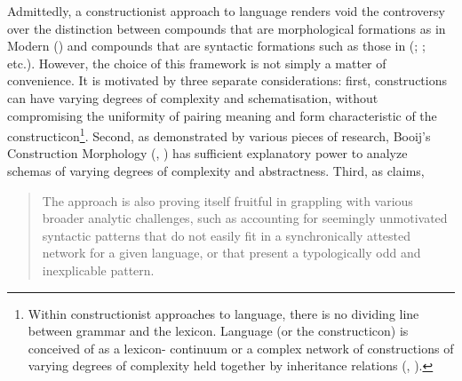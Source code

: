\documentclass[output=paper]{LSP/langsci}
\begin{document}
Admittedly, a constructionist approach to language renders void the controversy over the distinction between compounds that are morphological formations as in Modern  (\citet{Ralli2013moderngreek,Ralli2013locus}) and compounds that are syntactic formations such as those in  (\citealt{BagriacikRalli2015}; \citealt{Ralli2013locus}; etc.). However, the choice of this framework is not simply a matter of convenience. It is motivated by three separate considerations: first, constructions can have varying degrees of complexity and schematisation, without compromising the uniformity of pairing meaning and form characteristic of the constructicon\footnote{Within constructionist approaches to language, there is no dividing line between grammar and the lexicon. Language (or the constructicon) is conceived of as a lexicon- continuum or a complex network of constructions of varying degrees of complexity held together by inheritance relations (\citealt{Goldberg2003},  \citealt{Hoffmann2013}).}. Second, as demonstrated by various pieces of research, Booij’s Construction Morphology (\citealt{Booij2007}, \citealt{Booij2009wordstructure}) has sufficient explanatory power to analyze schemas of varying degrees of complexity and abstractness. Third, as \citet[2]{Fried2013} claims, 


\begin{quotation}
The  approach is also proving itself fruitful in grappling with various broader analytic challenges, such as accounting for seemingly unmotivated syntactic patterns that do not easily fit in a synchronically attested  network for a given language, or that present a typologically odd and inexplicable pattern.                     
\end{quotation}                               
\end{document}
